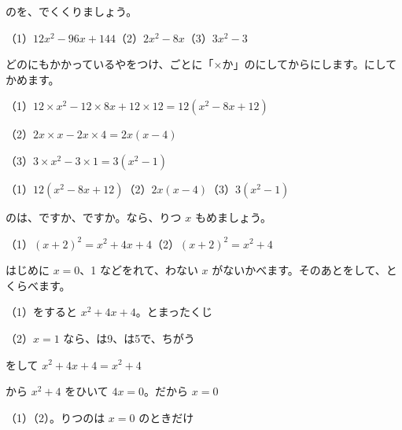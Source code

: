 \begin{reidai}
のを、でくくりましょう。\par
（1）$12x^2-96x+144$\qquad（2）$2x^2-8x$\qquad（3）$3x^2-3$\par
\kangaekata どのにもかかっているやをつけ、ごとに「×か」のにしてからにします。にしてかめます。\par
\shiki（1）\nobreak $12\times x^2-12\times8x+12\times12=12(x^2-8x+12)$\par
\hspace*{2.6\zw}（2）\nobreak $2x\times x-2x\times4=2x(x-4)$\par
\hspace*{2.6\zw}（3）\nobreak $3\times x^2-3\times1=3(x^2-1)$\par
\kotae（1）\nobreak $12(x^2-8x+12)$\qquad（2）\nobreak $2x(x-4)$\qquad（3）\nobreak $3(x^2-1)$
\end{reidai}

\begin{reidai}
のは、ですか、ですか。なら、りつ $x$ もめましょう。\par
（1）$(x+2)^2=x^2+4x+4$\qquad（2）$(x+2)^2=x^2+4$\par
\kangaekata はじめに $x=0$、1 などをれて、わない $x$ がないかべます。そのあとをして、とくらべます。\par
\shiki（1）\nobreak {}をすると $x^2+4x+4$。とまったくじ\par
\hspace*{2.6\zw}（2）\nobreak $x=1$ なら、は9、は5で、ちがう\par
\hspace*{2.6\zw}\phantom{（2）}をして $x^2+4x+4=x^2+4$\par
\hspace*{2.6\zw}\phantom{（2）}から $x^2+4$ をひいて $4x=0$。だから $x=0$\par
\kotae（1）\nobreak {}\qquad（2）\nobreak {}。りつのは $x=0$ のときだけ
\end{reidai}

